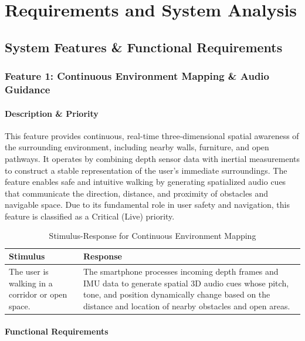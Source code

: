\chapter{Requirements and System Analysis}

\section{System Features \& Functional Requirements}

\subsection{Feature 1: Continuous Environment Mapping \& Audio Guidance}

\subsubsection{Description \& Priority}

This feature provides continuous, real-time three-dimensional spatial awareness of the surrounding environment, including nearby walls, furniture, and open pathways. It operates by combining depth sensor data with inertial measurements to construct a stable representation of the user’s immediate surroundings. The feature enables safe and intuitive walking by generating spatialized audio cues that communicate the direction, distance, and proximity of obstacles and navigable space. Due to its fundamental role in user safety and navigation, this feature is classified as a Critical (Live) priority.

\begin{table}[H]
    \centering
    \begin{tabular}{|p{}|p{}|}
        \hline
        \textbf{Stimulus} & \textbf{Response} \\
        \hline
        The user is walking in a corridor or open space. &
        The smartphone processes incoming depth frames and IMU data to generate spatial 3D audio cues whose pitch, tone, and position dynamically change based on the distance and location of nearby obstacles and open areas. \\
        \hline
    \end{tabular}
    \caption{Stimulus-Response for Continuous Environment Mapping}
\end{table}

\subsubsection{Functional Requirements}


